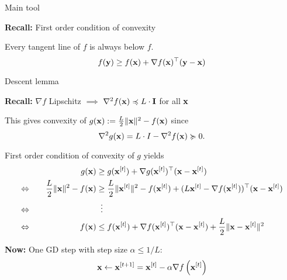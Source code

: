 \documentclass[11pt,compress,t,notes=noshow, xcolor=table]{beamer}
\begin{document}
\begin{framei}{Main tool}
\item\textbf{Recall:} First order condition of convexity
\begin{framed}\centering
Every tangent line of $f$ is always below $f$.
$$f(\mathbf{y}) \geq f(\mathbf{x}) + \nabla f(\mathbf{x})^\top (\mathbf{y} - \mathbf{x})$$
\end{framed}
\end{framei}

\begin{framei}{Descent lemma}
\item\textbf{Recall:} $\nabla f$ Lipschitz $\implies$ $\nabla^2 f(\mathbf{x}) \preccurlyeq L \cdot \mathbf{I}$ for all $\mathbf{x}$
\item This gives convexity of $g(\mathbf{x}) := \frac{L}{2}\|\mathbf{x}\|^2 - f(\mathbf{x})$ since $$\nabla^2 g(\mathbf{x}) = L \cdot I - \nabla^2 f(\mathbf{x}) \succcurlyeq 0.$$
\item First order condition of convexity of $g$ yields
\begin{alignat*}{3}
&& g(\xv) &\geq g(\xv^{[t]}) + \nabla g(\xv^{[t]})^\top (\xv - \xv^{[t]}) \\
\Leftrightarrow \quad && \frac{L}{2} \|\xv\|^2 - f(\xv) &\geq \frac{L}{2} \|\xv^{[t]}\|^2 - f(\xv^{[t]}) + (L\xv^{[t]} - \nabla f(\xv^{[t]}))^\top (\xv - \xv^{[t]}) \\
\Leftrightarrow \quad && &\vdotswithin{\geq} \\
\Leftrightarrow \quad && \fx &\leq f(\xv^{[t]}) + \nabla f(\xv^{[t]})^\top (\xv - \xv^{[t]}) + \frac{L}{2} \|\xv - \xv^{[t]}\|^2
\end{alignat*}
\item\textbf{Now:} One GD step with step size $\alpha \leq 1/L$:
$$\mathbf{x} \leftarrow \mathbf{x}^{[t+1]} = \mathbf{x}^{[t]} - \alpha \nabla f\left(\mathbf{x}^{[t]}\right)$$
\end{framei}
\end{document}
